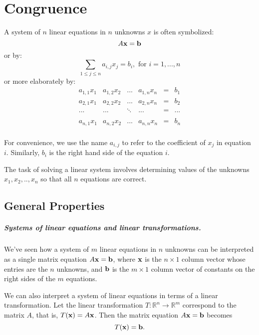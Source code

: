 \chapter{Congruence}
A system of $n$ linear equations in $n$ unknowns $x$ is often symbolized:
\begin{displaymath}
A{\bf x}={\bf b}
\end{displaymath}
or by:
\begin{displaymath}
  \sum_{1\leq j \leq n} a_{i,j} x_j = b_i, {\text{ for }} i = 1, ..., n
\end{displaymath}
or more elaborately by:
\begin{displaymath}
\begin{array}{llllll}
a_{1,1} x_1 & a_{1,2} x_2 & ... &a_{1,n} x_n&   =  & b_1 \\
a_{2,1} x_1 & a_{2,2} x_2 & ... &a_{2,n} x_n&   =  & b_2 \\
... & ... & \ddots &...&   =  & ... \\\\
a_{n,1} x_1 & a_{n,2} x_2 & ... &a_{n,n} x_n&   =  & b_n \\
\end{array}
\end{displaymath}

For convenience, we use the name $a_{i,j}$ to refer to the coefficient of $x_j$ in equation $i$. 
Similarly, $b_i$ is the right hand side of the equation $i$.  

The task of solving a linear system involves determining values of the unknowns $x_1, x_2, .., x_n$ so that 
all $n$ equations are correct.

\section{General Properties}
\paragraph{Systems of linear equations and linear transformations.}
We've seen how a system of $m$ linear equations in $n$ unknowns can be interpreted as a single matrix equation $A{\bf x}={\bf b}$, where ${\bf x}$ is the $n\times1$ column vector whose entries are the $n$ unknowns, and $\bf b$ is the $m\times1$ column vector of constants on the right sides of the $m$ equations.

We can also interpret a system of linear equations in terms of a linear transformation.  Let the linear transformation $T:\mathbb{R}^n\to\mathbb{R}^m$ correspond to the matrix $A$, that is, $T({\bf x})=A{\bf x}$.  Then the matrix equation $A{\bf x}={\bf b}$ becomes
$$T({\bf x})={\bf b}.$$

